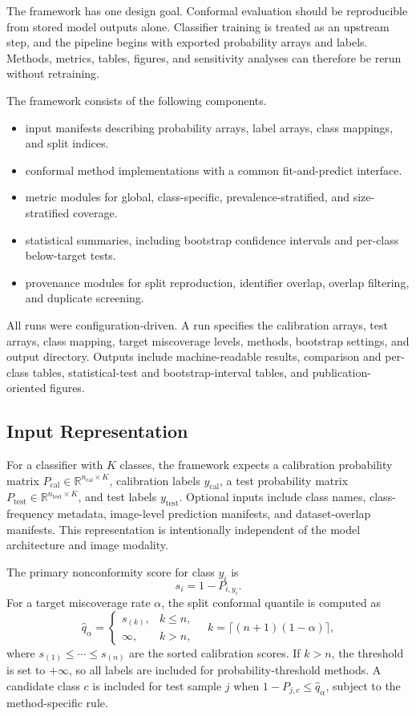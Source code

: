 ﻿\documentclass[preprint,12pt]{elsarticle}
\begin{document}
The framework has one design goal. Conformal evaluation should be reproducible from stored model outputs alone. Classifier training is treated as an upstream step, and the pipeline begins with exported probability arrays and labels. Methods, metrics, tables, figures, and sensitivity analyses can therefore be rerun without retraining.

The framework consists of the following components.
\begin{itemize}
    \item input manifests describing probability arrays, label arrays, class mappings, and split indices.
    \item conformal method implementations with a common fit-and-predict interface.
    \item metric modules for global, class-specific, prevalence-stratified, and size-stratified coverage.
    \item statistical summaries, including bootstrap confidence intervals and per-class below-target tests.
    \item provenance modules for split reproduction, identifier overlap, overlap filtering, and duplicate screening.
\end{itemize}

All runs were configuration-driven. A run specifies the calibration arrays, test arrays, class mapping, target miscoverage levels, methods, bootstrap settings, and output directory. Outputs include machine-readable results, comparison and per-class tables, statistical-test and bootstrap-interval tables, and publication-oriented figures.

\subsection{Input Representation}

For a classifier with $K$ classes, the framework expects a calibration probability matrix $P_{\mathrm{cal}} \in \mathbb{R}^{n_{\mathrm{cal}} \times K}$, calibration labels $y_{\mathrm{cal}}$, a test probability matrix $P_{\mathrm{test}} \in \mathbb{R}^{n_{\mathrm{test}} \times K}$, and test labels $y_{\mathrm{test}}$. Optional inputs include class names, class-frequency metadata, image-level prediction manifests, and dataset-overlap manifests. This representation is intentionally independent of the model architecture and image modality.

The primary nonconformity score for class $y_i$ is
\[
s_i = 1 - P_{i,y_i}.
\]
For a target miscoverage rate $\alpha$, the split conformal quantile is computed as
\[
\hat{q}_{\alpha} =
\begin{cases}
s_{(k)}, & k \leq n,\\
\infty, & k > n,
\end{cases}
\quad
k = \lceil(n+1)(1-\alpha)\rceil,
\]
where $s_{(1)} \leq \cdots \leq s_{(n)}$ are the sorted calibration scores. If $k>n$, the threshold is set to $+\infty$, so all labels are included for probability-threshold methods. A candidate class $c$ is included for test sample $j$ when $1 - P_{j,c} \leq \hat{q}_{\alpha}$, subject to the method-specific rule.
\end{document}
